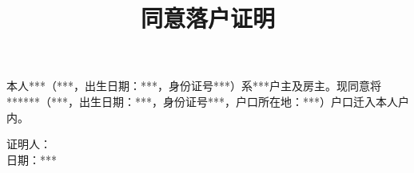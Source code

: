 \documentclass[12pt,a4paper]{article}
\author{}
\title{同意落户证明}
\date{\vspace{-10ex}}
\newcommand{\applicantName}{***}
\newcommand{\applicantSex}{***}
\newcommand{\applicantBirthday}{***}
\newcommand{\applicantIDCardNo}{***}
\newcommand{\applicantResidentAddress}{***}
\newcommand{\personRelation}{***}
\newcommand{\personName}{***}
\newcommand{\personSex}{***}
\newcommand{\personBirthday}{***}
\newcommand{\personIDCardNo}{***}
\newcommand{\spouseResidentAddress}{***}
\newcommand{\certificateDate}{***}
\begin{document}
\maketitle
\thispagestyle{empty}

本人\applicantName（\applicantSex，出生日期：\applicantBirthday，身份证号\applicantIDCardNo）系\applicantResidentAddress 户主及房主。现同意将\personRelation\personName（\personSex，出生日期：\personBirthday，身份证号\personIDCardNo，户口所在地：\spouseResidentAddress）户口迁入本人户内。
\begin{flushright}
证明人：　　　　　　\\
日期：\certificateDate
\end{flushright}
\end{document}
